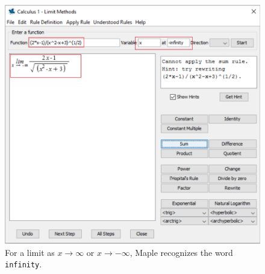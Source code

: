 \begin{figure}[h]
\caption{For a limit as $x \rightarrow \infty$ or $x \rightarrow -\infty$, Maple recognizes the word \texttt{infinity}.}
\centering
\includegraphics[width=\textwidth]{tutorials/figures/LimitTutorQ2-1-eps-converted-to.pdf}
\end{figure}

